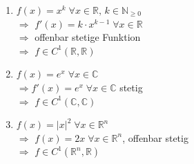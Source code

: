 \begin{example}
	\begin{enumerate}[label={\alph*)}]
		\item $f(x) = x^k\;\forall x\in\mathbb{R},\, k\in\mathbb{N}_{\ge 0}$ \\
		$\Rightarrow$ $f'(x) = k\cdot x^{k-1}\;\forall x\in \mathbb{R}$ \\
		$\Rightarrow$ offenbar stetige Funktion \\ $\Rightarrow$ $f\in C^1(\mathbb{R}, \mathbb{R})$
		
		\item $f(x) = e^x\;\forall x\in\mathbb{C}$ \\
		$\Rightarrow f'(x) = e^x \;\forall x\in\mathbb{C}$ stetig \\
		$\Rightarrow$ $f\in C^1(\mathbb{C},\mathbb{C})$
		
		\item $f(x) = \vert x \vert^2\;\forall x\in\mathbb{R}^n$ \\
		$\Rightarrow$ $f(x) = 2x\;\forall x\in\mathbb{R}^n$, offenbar stetig \\
		$\Rightarrow$ $f\in C^1(\mathbb{R}^n, \mathbb{R})$
	\end{enumerate}
\end{example}

